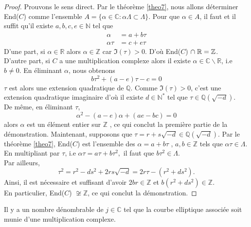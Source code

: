 \documentclass[a4paper]{article}
\begin{document}
\begin{proof}
Prouvons le sens direct.
Par le théorème \ref{theo7}, nous allons déterminer End($C$) comme l'ensemble $A=\{\alpha \in \mathbb{C} : \alpha \Lambda \subset \Lambda \}$.
Pour que $\alpha \in A$, il faut et il suffit qu'il existe $a,b,c,e \in \mathbb{N}$ tel que
\begin{align*}
\alpha &=a+b\tau \\
\alpha \tau&=c+e\tau
\end{align*}
D'une part, si $\alpha \in \mathbb{R}$ alors $\alpha \in \mathbb{Z}$ car $\Im(\tau)>0$. D'où End($C$) $\cap \hspace{0.1cm} \mathbb{R}= \mathbb{Z}$.  \\
D'autre part, si $C$ a une multiplication complexe alors il existe $\alpha \in \mathbb{C} \backslash \mathbb{R}$, i.e $b \neq 0$.
En éliminant $\alpha$, nous obtenons
\begin{equation*}
b\tau^2+(a-e)\tau-c=0
\end{equation*}
$\tau$ est alors une extension quadratique de $\mathbb{Q}$. Comme $\Im(\tau) >0$, c'est une extension quadratique imaginaire d'où il existe $d \in \mathbb{N}^*$ tel que $\tau \in \mathbb{Q}(\sqrt{-d})$. \\
De même, en éliminant $\tau$,
\begin{equation*}
\alpha^2-(a-e)\alpha+(ae-bc)=0
\end{equation*}
alors $\alpha$ est un élément entier sur $\mathbb{Z}$ , ce qui conclut la première partie de la démonstration.
Maintenant, supposons que $\tau=r+s\sqrt{-d} \in \mathbb{Q}(\sqrt{-d})$. Par le théorème \ref{theo7}, End($C$) est l'ensemble des $\alpha=a+b\tau$ , $a,b \in \mathbb{Z}$ tels que $\alpha \tau \in \Lambda$.
En multipliant par $\tau$, i.e $\alpha \tau=a\tau+b\tau^2,$ il faut que $b\tau^2 \in \Lambda$. \\
 Par ailleurs, 
\begin{equation*}
\tau^2=r^2-ds^2+2rs\sqrt{-d}=2r\tau-(r^2+ds^2).
\end{equation*}
Ainsi, il est nécessaire et suffisant d'avoir $2br \in \mathbb{Z}$ et $b(r^2+ds^2) \in \mathbb{Z}$. \\
En particulier, End($C$) $\not \cong \mathbb{Z}$, ce qui conclut la démonstration.
\end{proof}

\begin{cor} 
Il y a un nombre dénombrable de $j \in \mathbb{C}$
tel que la courbe elliptique associée soit munie d'une multiplication complexe.
\end{cor}
\end{document}
